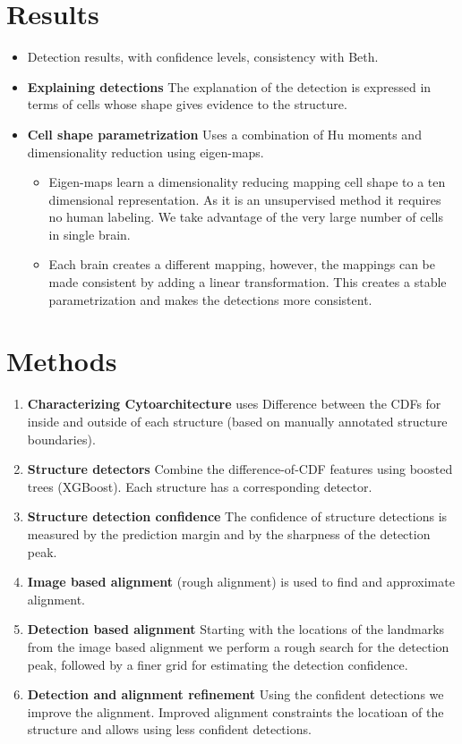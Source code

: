 \documentclass[runningheads]{llncs}
\begin{document}
\section{Results}
\begin{itemize}
    \item Detection results, with confidence levels, consistency with Beth.
    \item {\bf Explaining detections} The explanation of the detection is expressed in terms of cells whose shape gives evidence to the structure.
\item {\bf Cell shape parametrization} Uses a combination of Hu moments and dimensionality reduction using eigen-maps.
\begin{itemize}
    \item Eigen-maps learn a dimensionality reducing mapping cell shape to a ten dimensional representation.
    As it is an unsupervised method it requires no human labeling. We take advantage of the very large number of cells in single brain.
    \item Each brain creates a different mapping, however, the mappings can be made consistent by adding a linear transformation. This creates a stable parametrization and makes the detections more consistent.
\end{itemize}

\end{itemize}


\section{Methods}
\begin{enumerate}
\item{\bf Characterizing Cytoarchitecture} uses Difference between the CDFs for inside and outside of each structure (based on manually annotated structure boundaries). 
\item {\bf Structure detectors} Combine the difference-of-CDF features using boosted trees (XGBoost). Each structure has a corresponding detector.
\item {\bf Structure detection confidence} The confidence of structure detections is measured by the prediction margin and by the sharpness of the detection peak.
\item{\bf Image based alignment} (rough alignment) is used to find and approximate alignment.
\item {\bf Detection based alignment} Starting with the locations of the landmarks from the image based alignment we perform a rough search for the detection peak, followed by a finer grid for estimating the detection confidence.
\item{\bf Detection and alignment refinement} Using the confident detections we improve the alignment. Improved alignment constraints the locatioan of the structure and allows using less confident detections.
\end{enumerate}
\end{document}
